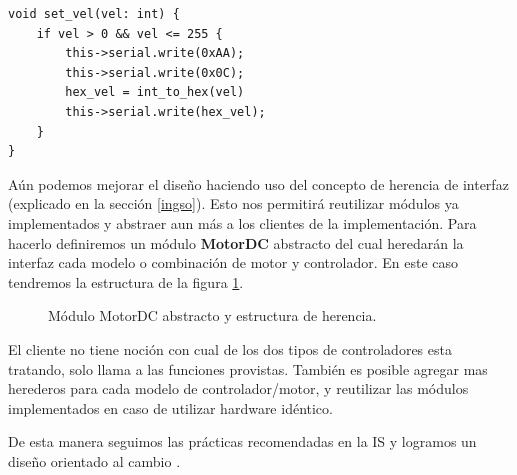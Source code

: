 \begin{lstlisting}[caption=Nueva definición set\_dir,label={nuevaSetDir}]
void set_vel(vel: int) {
    if vel > 0 && vel <= 255 {
        this->serial.write(0xAA);
        this->serial.write(0x0C);
        hex_vel = int_to_hex(vel)
        this->serial.write(hex_vel);
    }
}
\end{lstlisting}

Aún podemos mejorar el diseño haciendo uso del concepto de herencia de interfaz (explicado en la sección \ref{ingso}). Esto nos permitirá reutilizar módulos ya implementados y abstraer aun más a los clientes de la implementación. Para hacerlo definiremos un módulo \textbf{MotorDC} abstracto del cual heredarán la interfaz cada modelo o combinación de motor y controlador. En este caso tendremos la estructura de la figura \ref{estructuraHerencia}.

\begin{figure}
\caption{Módulo MotorDC abstracto y estructura de herencia.}
\label{estructuraHerencia}
\begin{center}
\end{center}
\end{figure}

El cliente no tiene noción con cual de los dos tipos de controladores esta tratando, solo llama a las funciones provistas. También es posible agregar mas herederos para cada modelo de controlador/motor, y reutilizar las módulos implementados en caso de utilizar hardware idéntico. 

De esta manera seguimos las prácticas recomendadas en la IS \cite{ShawGarlan1996, ghezzi2003, bass2003, DBLP:books/daglib/0030743} y logramos un diseño orientado al cambio \cite{Gamma:1995:DPE:186897}.

